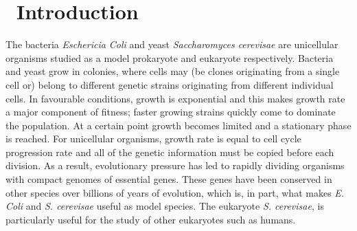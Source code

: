 \graphicspath{{images/}}

\section{\thesection~Introduction}
\label{sec:introduction}





The bacteria \textit{Eschericia Coli} and yeast \textit{Saccharomyces
  cerevisae} are unicellular organisms studied as a model prokaryote
and eukaryote respectively. Bacteria and yeast grow in colonies, where
cells may (be clones originating from a single cell or) belong to
different genetic strains originating from different individual
cells. In favourable conditions, growth is exponential and this makes
growth rate a major component of fitness; faster growing strains
quickly come to dominate the population. At a certain point growth
becomes limited and a stationary phase is reached. For unicellular
organisms, growth rate is equal to cell cycle progression rate and all
of the genetic information must be copied before each division. As a
result, evolutionary pressure has led to rapidly dividing organisms
with compact genomes of essential genes. These genes have been
conserved in other species over billions of years of evolution, which
is, in part, what makes \textit{E. Coli} and \textit{S.  cerevisae}
useful as model species. The eukaryote \textit{S. cerevisae}, is
particularly useful for the study of other eukaryotes such as humans.

